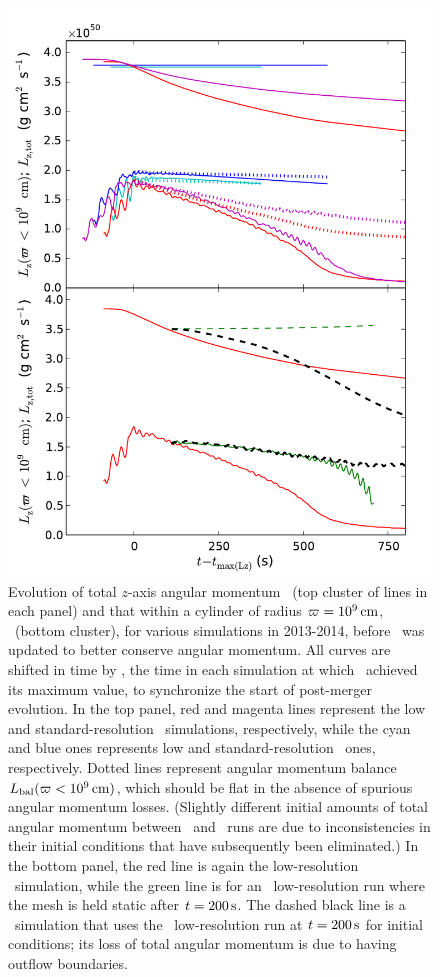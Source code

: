 \begin{figure}
\centering
\includegraphics[angle=0,width=0.6\columnwidth]{chapter3_zhu+u/figures/lz_development.pdf}
\caption{Evolution of total $z$-axis angular momentum \Lztot\ (top cluster of lines in each panel) and that within a cylinder of radius $\varpi = 10^9\,\mathrm{cm}$, \Lzinner\ (bottom cluster), for various simulations in 2013-2014, before \arepo\ was updated to better conserve angular momentum.  All curves are shifted in time by \tlm, the time in each simulation at which \Lzinner\ achieved its maximum value, to synchronize the start of post-merger evolution.  In the top panel, red and magenta lines represent the low and standard-resolution \arepo\ simulations, respectively, while the cyan and blue ones represents low and standard-resolution \gasoline\ ones, respectively.  Dotted lines represent angular momentum balance $\Lbal(\winnercyl)$, which should be flat in the absence of spurious angular momentum losses.  (Slightly different initial amounts of total angular momentum between \arepo\ and \gasoline\ runs are due to inconsistencies in their initial conditions that have subsequently been eliminated.)  In the bottom panel, the red line is again the low-resolution \arepo\ simulation, while the green line is for an \arepo\ low-resolution run where the mesh is held static after $t = 200\,\mathrm{s}$.  The dashed black line is a \flash\ simulation that uses the \arepo\ low-resolution run at $t = 200\,\mathrm{s}$ for initial conditions; its loss of total angular momentum is due to having outflow boundaries.}
\label{fig:c3_fix_angmo}
\end{figure}

